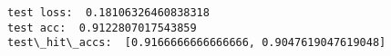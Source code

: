 \documentclass[11pt]{article}
\begin{document}
    \begin{Verbatim}[commandchars=\\\{\}]
test loss:  0.18106326460838318
test acc:  0.9122807017543859
test\_hit\_accs:  [0.9166666666666666, 0.9047619047619048]

    \end{Verbatim}


    
    
    
    
\end{document}
